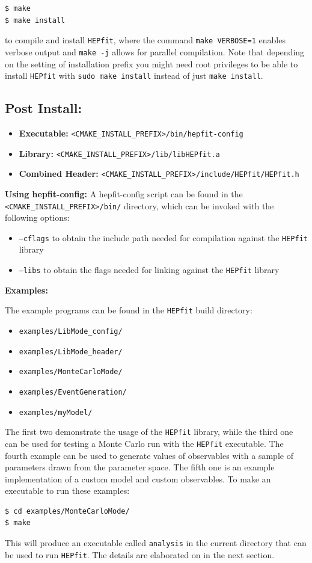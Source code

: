 \documentclass[preprint,3p,12pt]{elsarticle}
\newcommand{\HEPfit}{\texttt{HEPfit}\xspace}
\begin{document}
\begin{lstlisting} 
$ make  
$ make install  
\end{lstlisting} 
to compile and install \HEPfit, where the command \texttt{make VERBOSE=1}
enables verbose output and \texttt{make -j} allows for parallel compilation.
Note that depending on the setting of installation prefix you might
need root privileges to be able to install \HEPfit with \texttt{sudo make
install} instead of just \texttt{make install}.\\

\subsection{Post Install:}

\begin{itemize}
\item{\bf Executable:} \texttt{<CMAKE\_INSTALL\_PREFIX>/bin/hepfit-config}
\item{\bf Library:} \texttt{<CMAKE\_INSTALL\_PREFIX>/lib/libHEPfit.a}
\item{\bf Combined Header:} \texttt{<CMAKE\_INSTALL\_PREFIX>/include/HEPfit/HEPfit.h}
\end{itemize}

{\bf Using hepfit-config:}
A hepfit-config script can be found in the \texttt{<CMAKE\_INSTALL\_PREFIX>/bin/}
directory, which can be invoked with the following options:
\begin{itemize}
\item \texttt{--cflags} to obtain the include path needed for compilation against the \HEPfit library

\item \texttt{--libs} to obtain the flags needed for linking against the \HEPfit library
\end{itemize}

{\bf Examples:}

The example programs can be found in the \HEPfit build directory:  
\begin{itemize}
\item \texttt{examples/LibMode\_config/}  
\item \texttt{examples/LibMode\_header/} 
\item \texttt{examples/MonteCarloMode/}
\item \texttt{examples/EventGeneration/}
\item \texttt{examples/myModel/}
\end{itemize}
The first two demonstrate the usage of the \HEPfit library, while 
the third one can be used for testing a Monte Carlo run with the \HEPfit 
executable. The fourth example can be used to generate values of observables with a sample of parameters drawn from the parameter space. The fifth one is an example implementation of a custom 
model and custom observables. To make an executable to run these examples:
\begin{lstlisting} 
$ cd examples/MonteCarloMode/
$ make  
\end{lstlisting} 
This will produce an executable called \texttt{analysis} in the current directory that can be used to run \HEPfit. The details are elaborated on in the next section.
\end{document}
